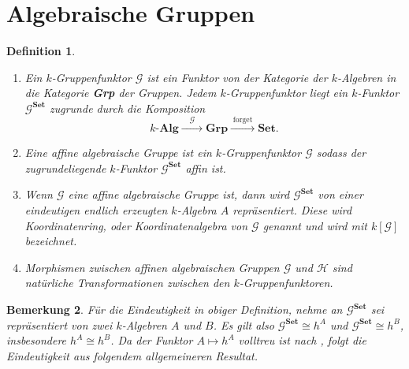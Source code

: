 \documentclass[a4paper, 11pt]{scrartcl}
\theoremstyle{basicstyle}
\newtheorem{definition}{Definition}[section]
\newtheorem{bemerkung}[definition]{Bemerkung}
\begin{document}
    
    \section{Algebraische Gruppen}

    \begin{definition}
        \begin{enumerate}
            \item Ein \emph{\(k\)-Gruppenfunktor} \(\mathcal{G}\) ist ein Funktor von der Kategorie der \(k\)-Algebren in die Kategorie \textbf{Grp} der Gruppen.
                Jedem \(k\)-Gruppenfunktor liegt ein \(k\)-Funktor \(\mathcal{G}^{\textbf{Set}}\) zugrunde durch die Komposition
                \[k\textbf{-Alg} \xrightarrow{\quad \mathcal{G} \quad} \textbf{Grp} \xrightarrow{\;\text{forget}\;} \textbf{Set}.\]

            \item Eine \emph{affine algebraische Gruppe} ist ein \(k\)-Gruppenfunktor \(\mathcal{G}\) sodass der zugrundeliegende \(k\)-Funktor \(\mathcal{G}^{\textbf{Set}}\) affin ist.
            
            \item Wenn \(\mathcal{G}\) eine affine algebraische Gruppe ist, dann wird \(\mathcal{G}^{\textbf{Set}}\) von einer eindeutigen endlich erzeugten \(k\)-Algebra \(A\) repräsentiert.
                Diese wird \emph{Koordinatenring}, oder \emph{Koordinatenalgebra} von \(\mathcal{G}\) genannt und wird mit \(k[\mathcal{G}]\) bezeichnet.

            \item Morphismen zwischen affinen algebraischen Gruppen \(\mathcal{G}\) und \(\mathcal{H}\) sind natürliche Transformationen zwischen den \(k\)-Gruppenfunktoren.
        \end{enumerate}
    \end{definition}

    \begin{bemerkung}
        Für die Eindeutigkeit in obiger Definition, nehme an \(\mathcal{G}^\textbf{Set}\) sei repräsentiert von zwei \(k\)-Algebren \(A\) und \(B\).
        Es gilt also \(\mathcal{G}^\textbf{Set} \cong h^A\) und \(\mathcal{G}^\textbf{Set} \cong h^B\), insbesondere \(h^A \cong h^B\).
        Da der Funktor \(A \mapsto h^A\) volltreu ist nach , folgt die Eindeutigkeit aus folgendem allgemeineren Resultat.
    \end{bemerkung}
\end{document}
